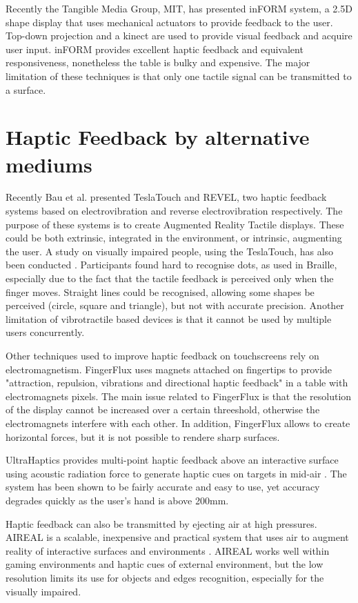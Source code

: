 Recently the Tangible Media Group, MIT, has presented inFORM system, a 2.5D shape display that uses mechanical actuators to provide feedback to the user\cite{follmer2013inform}. Top-down projection and a kinect are used to provide visual feedback and acquire user input. inFORM provides excellent haptic feedback and equivalent responsiveness, nonetheless the table is bulky and expensive. The major limitation of these techniques is that only one tactile signal can be transmitted to a surface. 

\section{Haptic Feedback by alternative mediums}

Recently Bau et al. presented TeslaTouch\cite{bau2010teslatouch} and REVEL\cite{bau2012revel}, two haptic feedback systems based on electrovibration and reverse electrovibration respectively. The purpose of these systems is to create Augmented Reality Tactile displays. These could be both extrinsic, integrated in the environment, or intrinsic, augmenting the user. A study on visually impaired people, using the TeslaTouch, has also been conducted \cite{xu2011tactile}. Participants found hard to recognise dots, as used in Braille, especially due to the fact that the tactile feedback is perceived only when the finger moves. Straight lines could be recognised, allowing some shapes be perceived (circle, square and triangle), but not with accurate precision. Another limitation of vibrotractile based devices is that it cannot be used by multiple users concurrently. 

Other techniques used to improve haptic feedback on touchscreens rely on electromagnetism. FingerFlux \cite{weiss2011fingerflux} uses magnets attached on fingertips to provide "attraction, repulsion, vibrations and directional haptic feedback" in a table with electromagnets pixels. The main issue related to FingerFlux is that the resolution of the display cannot be increased over a certain threeshold, otherwise the electromagnets interfere with each other. In addition, FingerFlux allows to create horizontal forces, but it is not possible to rendere sharp surfaces.    

UltraHaptics provides multi-point haptic feedback above an interactive surface using acoustic radiation force to generate haptic cues on targets in mid-air \cite{carter2013ultrahaptics}. The system has been shown to be fairly accurate and easy to use, yet accuracy degrades quickly as the user's hand is above 200mm. 

Haptic feedback can also be transmitted by ejecting air at high pressures. AIREAL is a scalable, inexpensive and practical system that uses air to augment reality of interactive surfaces and environments \cite{sodhi2013aireal}. AIREAL works well within gaming environments and haptic cues of external environment, but the low resolution limits its use for objects and edges recognition, especially for the visually impaired.